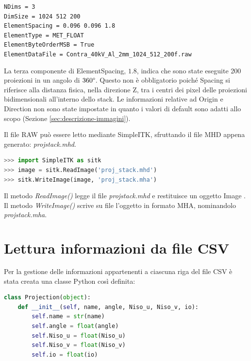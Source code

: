 \documentclass[a4paper,12pt, doubleside]{report}
\begin{document}
                \begin{lstlisting}[language=bash, frame=bt]
NDims = 3
DimSize = 1024 512 200
ElementSpacing = 0.096 0.096 1.8
ElementType = MET_FLOAT
ElementByteOrderMSB = True
ElementDataFile = Contra_40kV_Al_2mm_1024_512_200f.raw
                \end{lstlisting}
                    
                La terza componente di ElementSpacing, $1.8$, indica che sono state eseguite 200 proiezioni in un angolo di $360\degree$. Questo non è obbligatorio poiché Spacing si riferisce alla distanza fisica, nella direzione Z, tra i centri dei pixel delle proiezioni bidimensionali all'interno dello stack. Le informazioni relative ad Origin e Direction non sono state impostate in quanto i valori di default sono adatti allo scopo (Sezione \ref{sec:descrizione-immagini}).
                    
                \bigskip
                \par
                Il file RAW può essere letto mediante SimpleITK, sfruttando il file MHD appena generato: \textit{proj\textunderscore stack.mhd}.
                   
                \begin{lstlisting}[language=python, frame=bt]
>>> import SimpleITK as sitk
>>> image = sitk.ReadImage('proj_stack.mhd')
>>> sitk.WriteImage(image, 'proj_stack.mha')
                \end{lstlisting}
                    
                Il metodo \textit{ReadImage()} legge il file \textit{proj\textunderscore stack.mhd} e restituisce un oggetto Image \cite{itk-image-object}. Il metodo \textit{WriteImage()} \cite{sitk-write-image} scrive su file l'oggetto in formato MHA, nominandolo \textit{proj\textunderscore stack.mha}. 
        
        \section{Lettura informazioni da file CSV}
            \label{sec:lettura-csv}
            
            \par
                Per la gestione delle informazioni appartenenti a ciascuna riga del file CSV è stata creata una classe Python così definita:
            
                \begin{lstlisting}[language=python, frame=bt]
class Projection(object):
    def __init__(self, name, angle, Niso_u, Niso_v, io):
        self.name = str(name)
        self.angle = float(angle)
        self.Niso_u = float(Niso_u)
        self.Niso_v = float(Niso_v)
        self.io = float(io)
                \end{lstlisting}
            
\end{document}
